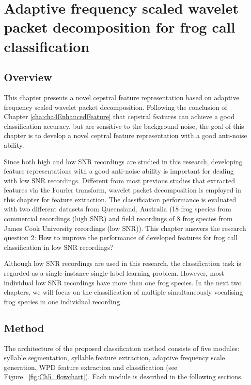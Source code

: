 
\chapter{Adaptive frequency scaled wavelet packet decomposition for frog call classification}
\label{cha:cha5WaveletFeature}


\section{Overview}
This chapter presents a novel cepstral feature representation based on adaptive frequency scaled wavelet packet decomposition. Following the conclusion of Chapter \ref{cha:cha4EnhancedFeature} that cepstral features can achieve a good classification accuracy, but are sensitive to the background noise, the goal of this chapter is to develop a novel ceptral feature representation with a good anti-noise ability.



Since both high and low SNR recordings are studied in this research, developing feature representations with a good anti-noise ability is important for dealing with low SNR recordings. Different from most previous studies that extracted features via the Fourier transform, wavelet packet decomposition is employed in this chapter for feature extraction. The classification performance is evaluated with two different datasets from Queensland, Australia (18 frog species from commercial recordings (high SNR) and field recordings of 8 frog species from James Cook University recordings (low SNR)). This chapter answers the research question 2: How to improve the performance of developed features for frog call classification in low SNR recordings? 


Although low SNR recordings are used in this research, the classification task is regarded as a single-instance single-label learning problem.
However, most individual low SNR recordings have more than one frog species. In the next two chapters, we will focus on the classification of multiple simultaneously vocalising frog species in one individual recording.





\section{Method}
The architecture of the proposed classification method consists of five modules: syllable segmentation, syllable feature extraction, adaptive frequency scale generation, WPD feature extraction and classification (see Figure.~\ref{fig:Ch5_flowchart}). Each module is described in the following sections. 

